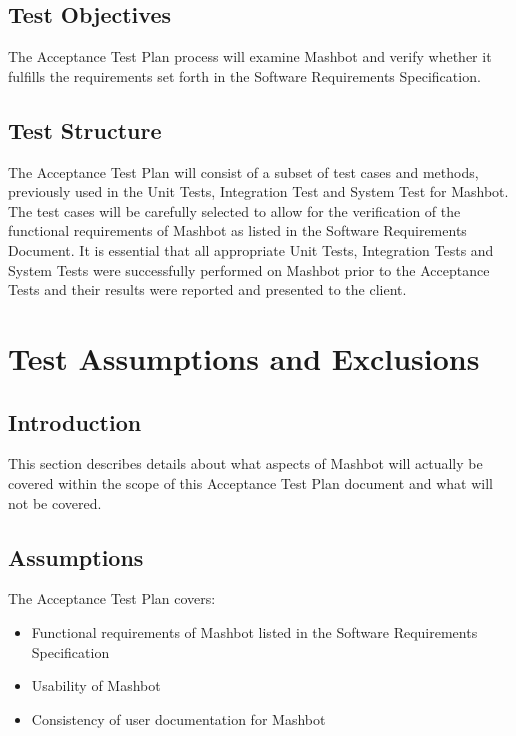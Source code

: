 \documentclass{article}
\begin{document}
\subsection{Test Objectives}

The Acceptance Test Plan process will examine Mashbot and verify
whether it fulfills the requirements set forth in the Software
Requirements Specification.


\subsection{Test Structure}

The Acceptance Test Plan will consist of a subset of test cases and
methods, previously used in the Unit Tests, Integration Test and
System Test for Mashbot. The test cases will be carefully selected to
allow for the verification of the functional requirements of Mashbot
as listed in the Software Requirements Document. It is essential that
all appropriate Unit Tests, Integration Tests and System Tests were
successfully performed on Mashbot prior to the Acceptance Tests
and their results were reported and presented to the client.

\section{Test Assumptions and Exclusions} %

\subsection{Introduction}

This section describes details about what aspects of Mashbot will actually be
covered within the scope of this Acceptance Test Plan document and what will
not be covered.

\subsection{Assumptions}

The Acceptance Test Plan covers:

\begin{itemize}
\item Functional requirements of Mashbot listed in the Software
Requirements Specification
\item Usability of Mashbot
\item Consistency of user documentation for Mashbot
\end{itemize}
\end{document}
